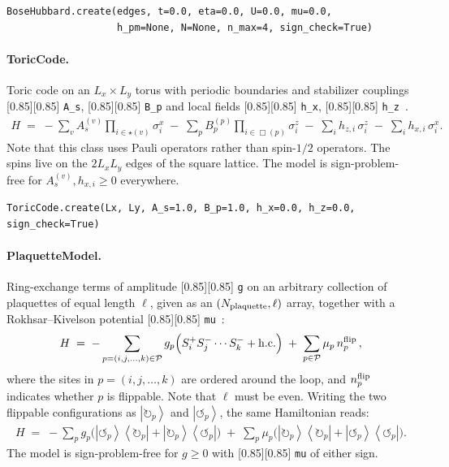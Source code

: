 \documentclass{SciPost}
\newcommand{\pyinline}[1]{\begingroup\setlength{\fboxsep}{0pt}%
  \colorbox{gray!15}{\raisebox{0pt}[0.85\ht\strutbox][0.85\dp\strutbox]{%
    \hspace{1pt}\lstinline{#1}\hspace{1pt}}}\endgroup}
\newcommand{\cw}{\circlearrowright}
\newcommand{\ccw}{\circlearrowleft}
\providecommand{\ket}[1]{\left|#1\right\rangle}
\providecommand{\bra}[1]{\left\langle#1\right|}
\begin{document}
\begin{lstlisting}
BoseHubbard.create(edges, t=0.0, eta=0.0, U=0.0, mu=0.0,
                   h_pm=None, N=None, n_max=4, sign_check=True)
\end{lstlisting}

\paragraph{ToricCode.}
Toric code on an $L_x \times L_y$ torus with periodic boundaries and stabilizer couplings \pyinline{A_s}, \pyinline{B_p} and local fields \pyinline{h_x}, \pyinline{h_z}~\cite{kitaev_fault_2003}.
\begin{align}
	H \;=\; -\sum_v A_s^{(v)} \prod_{i \in \star(v)} \sigma^x_i
		\;-\; \sum_p B_p^{(p)} \prod_{i \in \Box(p)} \sigma^z_i
		\;-\; \sum_i h_{z,i}\, \sigma^z_i \;-\; \sum_i h_{x,i}\, \sigma^x_i.
	\label{eq:H_toric_app}
\end{align}
Note that this class uses Pauli operators rather than spin-$1/2$ operators.
%
The spins live on the $2 L_x L_y$ edges of the square lattice.
%
The model is sign-problem-free for $A_s^{(v)}, h_{x,i} \geq 0$ everywhere.\\

\begin{lstlisting}
ToricCode.create(Lx, Ly, A_s=1.0, B_p=1.0, h_x=0.0, h_z=0.0, sign_check=True)
\end{lstlisting}

\paragraph{PlaquetteModel.}
Ring-exchange terms of amplitude \pyinline{g} on an arbitrary collection of plaquettes of equal length $\ell$, given as an $(N_{\rm plaquette}, \ell)$ array, together with a Rokhsar--Kivelson potential \pyinline{mu}~\cite{rokhsar_superconductivity_1988}:
\begin{align}
	H \;=\; -\sum_{p=(i,j,\ldots,k)\in \mathcal{P}} g_p \Big( S^+_i S^-_j \cdots S^-_k + {\rm h.c.} \Big)
	\;+\; \sum_{p\in\mathcal{P}} \mu_p\, n^{\rm flip}_p\,,
	\label{eq:H_plaquette_app}
\end{align}
where the sites in $p=(i,j,\ldots,k)$ are ordered around the loop, and $n^{\rm flip}_p$ indicates whether $p$ is flippable.
%
Note that $\ell$ must be even.
%
Writing the two flippable configurations as $\ket{\cw_p}$ and $\ket{\ccw_p}$, the same Hamiltonian reads:
\begin{align}
	H \;=\; -\sum_p g_p \Big( \ket{\ccw_p}\!\bra{\cw_p} + \ket{\cw_p}\!\bra{\ccw_p} \Big)
		\;+\; \sum_p \mu_p \Big( \ket{\cw_p}\!\bra{\cw_p} + \ket{\ccw_p}\!\bra{\ccw_p} \Big).
	\label{eq:H_plaquette_app_arrows}
\end{align}
The model is sign-problem-free for $g \geq 0$ with \pyinline{mu} of either sign.\\
\end{document}
